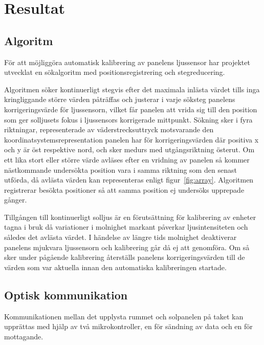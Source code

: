 \section{Resultat} %
\label{sec:resultat}
    \subsection{Algoritm} %
    \label{sub:algoritm}
        För att möjliggöra automatisk kalibrering av panelens ljussensor har projektet utvecklat en sökalgoritm med positionsregistrering och stegreducering. \bigskip

        Algoritmen söker kontinuerligt stegvis efter det maximala inlästa värdet tills inga kringliggande större värden påträffas och justerar i varje söksteg panelens korrigeringsvärde för ljussensorn, vilket får panelen att vrida sig till den position som ger solljusets fokus i ljussensors korrigerade mittpunkt. Sökning sker i fyra riktningar, representerade av väderstrecksuttryck motsvarande den koordinatsystemsrepresentation panelen har för korrigeringsvärden där positiva x och y är öst respektive nord, och sker medurs med utgångsriktning österut. Om ett lika stort eller större värde avläses efter en vridning av panelen så kommer nästkommande undersökta position vara i samma riktning som den senast utförda, då avlästa värden kan representeras enligt figur~\ref{fig:array}. Algoritmen registrerar besökta positioner så att samma position ej undersöks upprepade gånger. \bigskip

        Tillgången till kontinuerligt solljus är en förutsättning för kalibrering av enheter tagna i bruk då variationer i molnighet markant påverkar ljusintensiteten och således det avlästa värdet. I händelse av längre tids molnighet deaktiverar panelens mjukvara ljussensorn och kalibrering går då ej att genomföra. Om så sker under pågående kalibrering återställs panelens korrigeringsvärden till de värden som var aktuella innan den automatiska kalibreringen startade.

    \subsection{Optisk kommunikation} %
    \label{sub:optisk_kommunikation}

        Kommunikationen mellan det upplysta rummet och solpanelen på taket kan upprättas med hjälp av två mikrokontroller, en för sändning av data och en för mottagande.\bigskip

